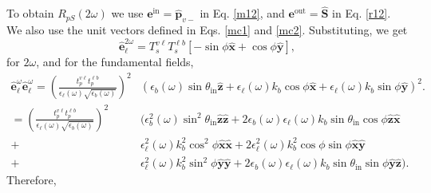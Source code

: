 To obtain $R_{pS}(2\omega)$ we use
$\mathbf{e}^{\mathrm{in}}=\hat{\mathbf{p}}_{v-}$ in Eq. \eqref{m12}, and
$\mathbf{e}^{\mathrm{out}}=\hat{\mathbf{S}}$ in Eq. \eqref{r12}. We also use
the unit vectors defined in Eqs. \eqref{mc1} and
\eqref{mc2}. Substituting, we get
\begin{equation*}
\hat{\mathbf{e}}^{2\omega}_{\ell} 
= T^{v\ell}_{s}T^{\ell b}_{s}
\left[-\sin\phi\hat{\mathbf{x}} + \cos\phi\hat{\mathbf{y}}\right],
\end{equation*}
for $2\omega$, and for the fundamental fields,
\begin{align*}
\hat{\mathbf{e}}^{\omega}_{\ell}\hat{\mathbf{e}}^{\omega}_{\ell}
= \left(
\frac{t^{v\ell}_{p}t^{\ell b}_{p}}
       {\epsilon_{\ell}(\omega)\sqrt{\epsilon_{b}(\omega)}}
\right)^{2}
&\left(
  \epsilon_{b}(\omega)\sin\theta_{\mathrm{in}}\hat{\mathbf{z}}
+ \epsilon_{\ell}(\omega)k_{b}\cos\phi\hat{\mathbf{x}}
+ \epsilon_{\ell}(\omega)k_{b}\sin\phi\hat{\mathbf{y}}
\right)^{2}.\\
= \left(
\frac{t^{v\ell}_{p}t^{\ell b}_{p}}
       {\epsilon_{\ell}(\omega)\sqrt{\epsilon_{b}(\omega)}}
\right)^{2}
&\big(
  \epsilon_{b}^{2}(\omega)\sin^{2}\theta_{\mathrm{in}}\hat{\mathbf{z}}\hat{\mathbf{z}}
+ 2\epsilon_{b}(\omega)\epsilon_{\ell}(\omega)k_{b}\sin\theta_{\mathrm{in}}
   \cos\phi\hat{\mathbf{z}}\hat{\mathbf{x}}\\
+ &\epsilon^{2}_{\ell}(\omega)k^{2}_{b}\cos^{2}\phi
   \hat{\mathbf{x}}\hat{\mathbf{x}}
+ 2\epsilon^{2}_{\ell}(\omega)k^{2}_{b}\cos\phi\sin\phi
   \hat{\mathbf{x}}\hat{\mathbf{y}}\\
+ &\epsilon^{2}_{\ell}(\omega)k^{2}_{b}\sin^{2}\phi
   \hat{\mathbf{y}}\hat{\mathbf{y}}
+ 2\epsilon_{b}(\omega)\epsilon_{\ell}(\omega)k_{b}\sin\theta_{\mathrm{in}}\sin\phi
   \hat{\mathbf{y}}\hat{\mathbf{z}}
\big).
\end{align*}
Therefore,

